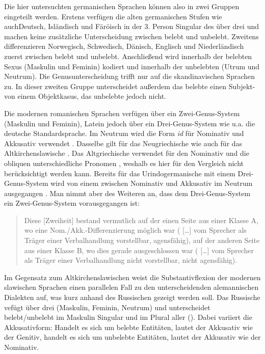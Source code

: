 Die hier untersuchten germanischen Sprachen können also in zwei Gruppen eingeteilt werden. Erstens verfügen die alten germanischen Stufen wie auch\linebreak Deutsch, Isländisch und Färöisch in der 3. Person Singular des  über drei  und machen keine zusätzliche Unterscheidung zwischen belebt und unbelebt. Zweitens differenzieren Norwegisch, Schwedisch, Dänisch, Englisch und Niederländisch zuerst zwischen belebt und unbelebt. Anschließend wird innerhalb der belebten  Sexus (Maskulin und Feminin) kodiert und innerhalb der unbelebten   (Utrum und Neutrum). Die Genusunterscheidung trifft nur auf die skandinavischen Sprachen zu. In dieser zweiten Gruppe unterscheidet außerdem das belebte  einen Subjekt- von einem Objektkasus, das unbelebte  jedoch nicht.

Die modernen romanischen Sprachen verfügen über ein Zwei-Genus-System (Maskulin und Feminin), Latein jedoch über ein Drei-Genus-System wie u.a. die deutsche Standardsprache. Im Neutrum wird die Form \textit{id} für Nominativ und Akkusativ verwendet \citep[90]{Touratier2013}. Dasselbe gilt für das Neugriechische \citep[95]{HoltonMackridgePhilippaki-Warburton2002} wie auch für das Altkirchenslawische \citep[50]{Trunte2005}. Das Altgriechische verwendet für den Nominativ und die obliquen  unterschiedliche Pronomen \citep[92]{Smyth1984}, weshalb es hier für den Vergleich nicht berücksichtigt werden kann. Bereits für das Urindogermanische mit einem Drei-Genus-System wird von einem  zwischen Nominativ und Akkusativ im Neutrum ausgegangen \citep[67]{Tichy2004}. Man nimmt aber des Weiteren an, dass dem Drei-Genus-System ein Zwei-Genus-System vorausgegangen ist:

\begin{quote}
Diese [Zweiheit] bestand vermutlich auf der einen Seite aus einer Klasse A, wo eine Nom./Akk.-Dif\-fe\-ren\-zie\-rung möglich war ( […] vom Sprecher als Träger einer Verbalhandlung vorstellbar, agensfähig), auf der anderen Seite aus einer Klasse B, wo dies gerade ausgeschlossen war ( […] vom Sprecher als Träger einer Verbalhandlung nicht vorstellbar, nicht agensfähig). \citep[323]{Meier-Brügger2010}
\end{quote}

Im Gegensatz zum Altkirchenslawischen weist die Substantivflexion der modernen slawischen Sprachen einen parallelen Fall zu den  unterscheidenden alemannischen Dialekten auf, was kurz anhand des Russischen gezeigt werden soll. Das Russische vefügt über drei  (Maskulin, Feminin, Neutrum) und unterscheidet be\-lebt/un\-be\-lebt im Maskulin Singular und im Plural aller  (). Dabei variiert die Akkusativform: Handelt es sich um belebte Entitäten, lautet der Akkusativ wie der Genitiv, handelt es sich um unbelebte Entitäten, lautet der Akkusativ wie der Nominativ.

